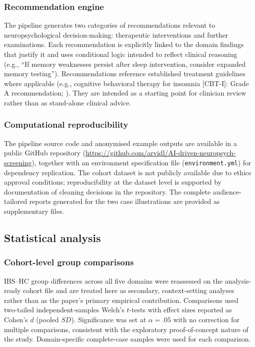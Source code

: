 \documentclass[11pt,a4paper]{article}
\begin{document}
\subsubsection{Recommendation engine}

The pipeline generates two categories of recommendations relevant to neuropsychological decision-making: therapeutic interventions and further examinations. Each recommendation is explicitly linked to the domain findings that justify it and uses conditional logic intended to reflect clinical reasoning (e.g., ``If memory weaknesses persist after sleep intervention, consider expanded memory testing''). Recommendations reference established treatment guidelines where applicable (e.g., cognitive behavioral therapy for insomnia [CBT-I]: Grade A recommendation; \cite{Riemann2017}). They are intended as a starting point for clinician review rather than as stand-alone clinical advice.

\subsubsection{Computational reproducibility}

The pipeline source code and anonymised example outputs are available in a public GitHub repository (\url{https://github.com/arvidl/AI-driven-neuropsych-screening}), together with an environment specification file (\texttt{environment.yml}) for dependency replication. The cohort dataset is not publicly available due to ethics approval conditions; reproducibility at the dataset level is supported by documentation of cleaning decisions in the repository. The complete audience-tailored reports generated for the two case illustrations are provided as supplementary files.


\subsection{Statistical analysis}

\subsubsection{Cohort-level group comparisons}

IBS--HC group differences across all five domains were reassessed on the analysis-ready cohort file and are treated here as secondary, context-setting analyses rather than as the paper's primary empirical contribution. Comparisons used two-tailed independent-samples Welch's $t$-tests with effect sizes reported as Cohen's $d$ (pooled $SD$). Significance was set at $\alpha = .05$ with no correction for multiple comparisons, consistent with the exploratory proof-of-concept nature of the study. Domain-specific complete-case samples were used for each comparison.
\end{document}
